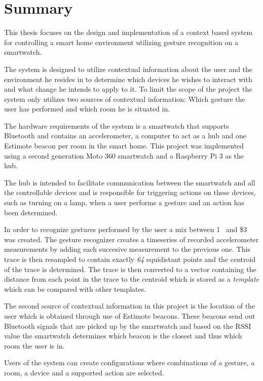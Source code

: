 \section*{Summary}
\label{formalities:summary}

This thesis focuses on the design and implementation of a context based system for controlling a smart home environment utilizing gesture recognition on a smartwatch.

The system is designed to utilize contextual information about the user and the environment he resides in to determine which devices he wishes to interact with and what change he intends to apply to it.
To limit the scope of the project the system only utilizes two sources of contextual information: Which gesture the user has performed and which room he is situated in.

The hardware requirements of the system is a smartwatch that supports Bluetooth and contains an accelerometer, a computer to act as a hub and one Estimote beacon per room in the smart home.
This project was implemented using a second generation Moto 360 smartwatch and a Raspberry Pi 3 as the hub.

The hub is intended to facilitate communication between the smartwatch and all the controllable devices and is responsible for triggering actions on these devices, such as turning on a lamp, when a user performs a gesture and an action has been determined.

In order to recognize gestures performed by the user a mix between 1\textcent~\cite{herold20121} and \$3~\cite{threedollar} was created.
The gesture recognizer creates a timeseries of recorded accelerometer measurements by adding each succesive measurement to the previous one.
This trace is then resampled to contain exactly \emph{64} equidistant points and the centroid of the trace is determined.
The trace is then converted to a vector containing the distance from each point in the trace to the centroid which is stored as a \emph{template} which can be compared with other templates.

The second source of contextual information in this project is the location of the user which is obtained through use of Estimote beacons.
These beacons send out Bluetooth signals that are picked up by the smartwatch and based on the RSSI value the smartwatch determines which beacon is the closest and thus which room the user is in.

Users of the system can create configurations where combinations of a gesture, a room, a device and a supported action are selected.

